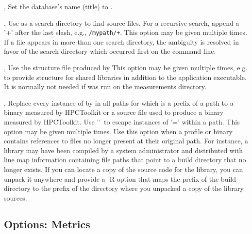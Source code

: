 \documentclass[english]{article}
\begin{document}
\begin{Description}
\item[\OptArg{--name}{name}, \OptArg{--title}{name}]
Set the database's name (title) to .

\item[\OptArg{-I}{dir}, \OptArg{--include}{dir}]
Use  as a search directory to find source files.
For a recursive search, append a '+' after the last slash, e.g., \texttt{/mypath/+}.
This option may be given multiple times.
\medskip
If a file appears in more than one search directory,
the ambiguity is resolved in favor of the search directory which occurred first on the command line.

\item[\OptArg{-S}{file}, \OptArg{--structure}{file}]
Use the structure file  produced by 
This option may be given multiple times,
e.g. to provide structure for shared libraries in addition to the application executable.
It is normally not needed if {} was run on the measurements directory.

\item[\OptArg{-R}{'old-path=new-path'}, \OptArg{--replace-path}{'old-path=new-path'}]
Replace every instance of  by 
in all paths for which  is a prefix of a path to a binary measured by HPCToolkit
or a source file used to produce a binary measured by HPCToolkit.
Use '\Bs'\ to escape instances of '=' within a path.
This option may be given multiple times.
\medskip
Use this option when a profile or binary contains references to files no
longer present at their original path.
For instance, a library may have been compiled by a system administrator and
distributed with line map information containing file paths that point to a
build directory that no longer exists.
If you can locate a copy of the source code for the library, you can unpack
it anywhere and provide a -R option that maps the prefix of the build
directory to the prefix of the directory where you unpacked a copy of the library sources.

\end{Description}

\subsection{Options: Metrics}
\end{document}
